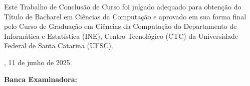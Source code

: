 \begin{folhadeaprovacao}
    \begin{center}
        {\imprimirautor}

        \begin{center}
            \ABNTEXchapterfont\bfseries\MakeUppercase{\imprimirtitulo}\ifnotempty{\imprimirsubtitulo}{:
            \imprimirsubtitulo}
        \end{center}

        \begin{minipage}{\textwidth}
            Este Trabalho de Conclusão de Curso foi julgado adequado para obtenção do Título de
            Bacharel em Ciências da Computação e aprovado em sua forma final pelo Curso de Graduação em Ciências da
            Computação do Departamento de Informática e Estatística (INE), Centro Tecnológico (CTC) da Universidade
            Federal de Santa Catarina (UFSC).
        \end{minipage}
    \end{center}

    \imprimirlocal, 11 de junho de 2025.


    \vspace{1cm}
    \textbf{Banca Examinadora:}

    \vspace{1cm}
    \assinatura{
    	\textbf{\imprimirorientador} \\
		\imprimirorientadorRotulo \\
		\imprimirinstituicao
    }

    \vspace{1cm}
    \assinatura{
		\textbf{\imprimircoorientador} \\
		\imprimircoorientadorRotulo \\
		\imprimirinstituicao
    }

    \vspace{1cm}
\end{folhadeaprovacao}